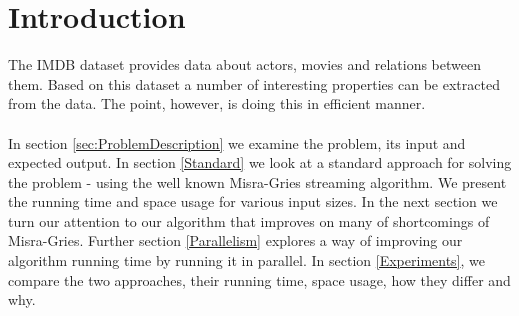 \label{Introduction}
\section{Introduction}

The IMDB dataset provides data about actors, movies and relations between them. Based on this dataset a number of interesting properties can be extracted from the data. The point, however, is doing this in efficient manner.
\\
\\
In section \ref{sec:ProblemDescription} we examine the problem, its input and expected output. In section \ref{Standard} we look at a standard approach for solving the problem - using the well known Misra-Gries streaming algorithm. We present the running time and space usage for various input sizes. In the next section we turn our attention to our algorithm that improves on many of shortcomings of Misra-Gries. Further section \ref{Parallelism} explores a way of improving our algorithm running time by running it in parallel. In section \ref{Experiments}, we compare the two approaches, their running time, space usage, how they differ and why.